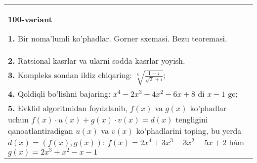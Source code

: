 \documentclass{article}
\begin{document}
\begin{tabular}{m{17cm}}
\textbf{100-variant}
\newline

\textbf{1.} Bir noma’lumli ko’phadlar. Gorner sxemasi. Bezu teoremasi.  \\
\textbf{2.} Ratsional kasrlar va ularni sodda kasrlar yoyish. \\
\textbf{3.} Kompleks sondan ildiz chiqaring: $\sqrt[6]{\frac{1-i}{\sqrt{3}+i}}$; \\
\textbf{4.} Qoldiqli bo’lishni bajaring: $x^4-2 x^3+4 x^2-6 x+8$ di $x-1$ ge; \\
\textbf{5.} Evklid algoritmidan foydalanib, $f(x)$ va $g(x)$ ko’phadlar uchun $f(x) \cdot u(x)+g(x) \cdot v(x)=d(x)$ tengligini qanoatlantiradigan $u(x)$ va $v(x)$ ko’phadlarini toping, bu yerda $d(x)=(f(x), g(x))$:  $f(x)=2 x^4+3 x^3-3 x^2-5 x+2$ hám $g(x)=2 x^3+x^2-x-1$ \\

\end{tabular}
\vspace{1cm}
\end{document}
